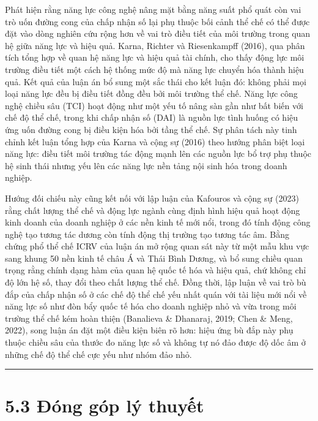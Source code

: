 \documentclass[
  a4paper,
  13pt]{extreport}
\begin{document}
Phát hiện rằng năng lực công nghệ nâng mặt bằng năng suất phổ quát còn
vai trò uốn đường cong của chấp nhận số lại phụ thuộc bối cảnh thể chế
có thể được đặt vào dòng nghiên cứu rộng hơn về vai trò điều tiết của
môi trường trong quan hệ giữa năng lực và hiệu quả. Karna, Richter và
Riesenkampff (2016), qua phân tích tổng hợp về quan hệ năng lực và hiệu
quả tài chính, cho thấy động lực môi trường điều tiết một cách hệ thống
mức độ mà năng lực chuyển hóa thành hiệu quả. Kết quả của luận án bổ
sung một sắc thái cho kết luận đó: không phải mọi loại năng lực đều bị
điều tiết đồng đều bởi môi trường thể chế. Năng lực công nghệ chiều sâu
(TCI) hoạt động như một yếu tố nâng sàn gần như bất biến với chế độ thể
chế, trong khi chấp nhận số (DAI) là nguồn lực tình huống có hiệu ứng
uốn đường cong bị điều kiện hóa bởi tầng thể chế. Sự phân tách này tinh
chỉnh kết luận tổng hợp của Karna và cộng sự (2016) theo hướng phân biệt
loại năng lực: điều tiết môi trường tác động mạnh lên các nguồn lực bổ
trợ phụ thuộc hệ sinh thái nhưng yếu lên các năng lực nền tảng nội sinh
hóa trong doanh nghiệp.

Hướng đối chiếu này cũng kết nối với lập luận của Kafouros và cộng sự
(2023) rằng chất lượng thể chế và động lực ngành cùng định hình hiệu quả
hoạt động kinh doanh của doanh nghiệp ở các nền kinh tế mới nổi, trong
đó tính động công nghệ tạo tương tác dương còn tính động thị trường tạo
tương tác âm. Bằng chứng phổ thể chế ICRV của luận án mở rộng quan sát
này từ một mẫu khu vực sang khung 50 nền kinh tế châu Á và Thái Bình
Dương, và bổ sung chiều quan trọng rằng chính dạng hàm của quan hệ quốc
tế hóa và hiệu quả, chứ không chỉ độ lớn hệ số, thay đổi theo chất lượng
thể chế. Đồng thời, lập luận về vai trò bù đắp của chấp nhận số ở các
chế độ thể chế yếu nhất quán với tài liệu mới nổi về năng lực số như đòn
bẩy quốc tế hóa cho doanh nghiệp nhỏ và vừa trong môi trường thể chế kém
hoàn thiện (Banalieva \& Dhanaraj, 2019; Chen \& Meng, 2022), song luận
án đặt một điều kiện biên rõ hơn: hiệu ứng bù đắp này phụ thuộc chiều
sâu của thước đo năng lực số và không tự nó đảo được độ dốc âm ở những
chế độ thể chế cực yếu như nhóm đảo nhỏ.

\begin{center}\rule{0.5\linewidth}{0.5pt}\end{center}

\hypertarget{ux111uxf3ng-guxf3p-luxfd-thuyux1ebft}{%
\section{5.3 Đóng góp lý
thuyết}\label{ux111uxf3ng-guxf3p-luxfd-thuyux1ebft}}
\end{document}
